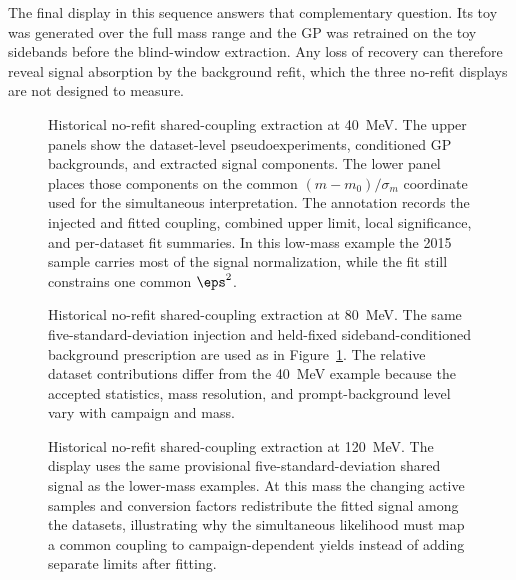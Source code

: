 The final display in this sequence answers that complementary question. Its toy was
generated over the full mass range and the GP was retrained on the toy sidebands before
the blind-window extraction. Any loss of recovery can therefore reveal signal
absorption by the background refit, which the three no-refit displays are not designed
to measure.

\clearpage
\begin{landscape}
\begin{figure}[H]
\centering
{}
\caption{Historical no-refit shared-coupling extraction at \SI{40}{MeV}. The upper
panels show the dataset-level pseudoexperiments, conditioned GP backgrounds, and
extracted signal components. The lower panel places those components on the common
$(m-m_0)/\sigma_m$ coordinate used for the simultaneous interpretation. The annotation
records the injected and fitted coupling, combined upper limit, local significance,
and per-dataset fit summaries. In this low-mass example the 2015 sample carries most
of the signal normalization, while the fit still constrains one common $\eps^2$.}
\label{fig:app-combined-extract-no-refit}
\end{figure}
\end{landscape}

\begin{landscape}
\begin{figure}[H]
\centering
{}
\caption{Historical no-refit shared-coupling extraction at \SI{80}{MeV}. The same
five-standard-deviation injection and held-fixed sideband-conditioned background
prescription are used as in Figure~\ref{fig:app-combined-extract-no-refit}. The
relative dataset contributions differ from the \SI{40}{MeV} example because the
accepted statistics, mass resolution, and prompt-background level vary with campaign
and mass.}
\label{fig:app-combined-extract-no-refit-80}
\end{figure}
\end{landscape}

\begin{landscape}
\begin{figure}[H]
\centering
{}
\caption{Historical no-refit shared-coupling extraction at \SI{120}{MeV}. The display
uses the same provisional five-standard-deviation shared signal as the lower-mass
examples. At this mass the changing active samples and conversion factors redistribute
the fitted signal among the datasets, illustrating why the simultaneous likelihood
must map a common coupling to campaign-dependent yields instead of adding separate
limits after fitting.}
\label{fig:app-combined-extract-no-refit-120}
\end{figure}
\end{landscape}

